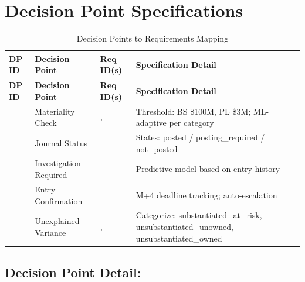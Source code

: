 \section{Decision Point Specifications}
\label{sec:decision-point-specs}

\begin{longtable}{@{}C{1.5cm}L{3cm}C{3cm}L{6cm}@{}}
\caption{Decision Points to Requirements Mapping}
\label{tab:decision-points-mapping} \\
\toprule
\textbf{DP ID} & \textbf{Decision Point} & \textbf{Req ID(s)} & \textbf{Specification Detail} \\
\midrule
\endfirsthead
\toprule
\textbf{DP ID} & \textbf{Decision Point} & \textbf{Req ID(s)} & \textbf{Specification Detail} \\
\midrule
\endhead
{} & Materiality Check & ,  & Threshold: BS \$100M, PL \$3M; ML-adaptive per category \\
 & Journal Status &  & States: posted / posting\_required / not\_posted \\
 & Investigation Required &  & Predictive model based on entry history \\
 & Entry Confirmation &  & M+4 deadline tracking; auto-escalation \\
 & Unexplained Variance & ,  & Categorize: substantiated\_at\_risk, unsubstantiated\_unowned, unsubstantiated\_owned \\
\bottomrule
\end{longtable}

\subsection{Decision Point Detail: }

